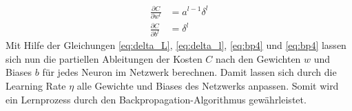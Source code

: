 \documentclass[../main.tex]{subfiles}
\begin{document}
\begin{align}\label{eq:bp4}
	\frac{\partial C}{\partial w^l} &= a^{l-1}\delta^l \\[12pt]\label{eq:bp3}
	\frac{\partial C}{\partial b^l} &= \delta^l 
\end{align}
Mit Hilfe der Gleichungen \ref{eq:delta_L}, \ref{eq:delta_l}, \ref{eq:bp4} und \ref{eq:bp4} lassen sich nun die partiellen Ableitungen der Kosten $C$ nach den Gewichten $w$ und Biases $b$ für jedes Neuron im Netzwerk berechnen. Damit lassen sich durch die Learning Rate $\eta$ alle Gewichte und Biases des Netzwerks anpassen. Somit wird ein Lernprozess durch den Backpropagation-Algorithmus gewährleistet.
\end{document}
